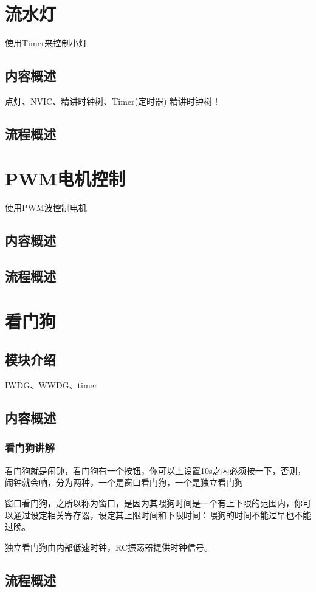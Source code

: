 \documentclass[UTF8]{ctexart}
\begin{document}
\section{流水灯}
使用Timer来控制小灯
\subsection{内容概述}
点灯、NVIC、精讲时钟树、Timer(定时器)
精讲时钟树！
\subsection{流程概述}


\section{PWM电机控制}
使用PWM波控制电机
\subsection{内容概述}
\subsection{流程概述}

\section{看门狗}

\subsection{模块介绍}
IWDG、WWDG、timer
\subsection{内容概述}
\subsubsection{看门狗讲解}
看门狗就是闹钟，看门狗有一个按钮，你可以上设置10s之内必须按一下，否则，闹钟就会响，分为两种，一个是窗口看门狗，一个是独立看门狗

窗口看门狗，之所以称为窗口，是因为其喂狗时间是一个有上下限的范围内，你可以通过设定相关寄存器，设定其上限时间和下限时间：喂狗的时间不能过早也不能过晚。

独立看门狗由内部低速时钟，RC振荡器提供时钟信号。

\subsection{流程概述}
\end{document}
